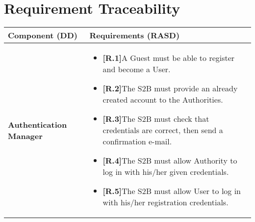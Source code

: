 
\setcounter{page}{38}
\newpage 
\section{Requirement Traceability}
\begin{table}[H]
\advance\leftskip-1.5cm
\begin{tabular}{|l|p{}|}
\hline
\textbf{\textbf{Component (DD)}}             &    \textbf{Requirements (RASD)}                                                           \\ \hline

\textbf{Authentication Manager}    & \begin{itemize}
    \item \textbf{[R.1]}A Guest must be able to register and \newline become a User.
    
    \item \textbf{[R.2]}The S2B must provide an already created account to the Authorities.

    \item \textbf{[R.3]}The S2B must check that credentials \newline are correct, then send a confirmation e-mail.
    \item \textbf{[R.4]}The S2B must allow Authority to log \newline in with his/her given credentials.
    \item \textbf{[R.5]}The S2B must allow User to log in with \newline his/her registration credentials.
\end{itemize}  \\ \hline









\end{tabular}
\end{table}

